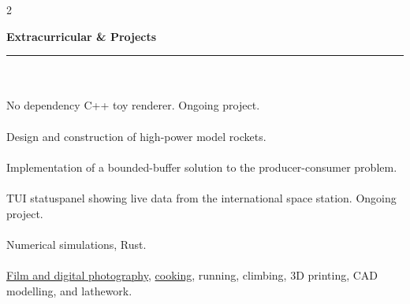 \documentclass[10pt]{article}
\begin{document}
\begin{multicols*}{2}
\begin{description}[leftmargin=6pt]
        \item \Large{\textbf{\textcolor{dt}{Extracurricular \& Projects}}\vspace{-8pt} \textcolor{dt}{\rule{0.5\textwidth-10pt}{0.2pt}}}\normalsize\\\vspace{5pt}  
        {}\\ No dependency C++ toy renderer. Ongoing project.\\ 
        \vspace{2pt}
        {}\\ Design and construction of high-power model rockets.\\
        \vspace{2pt}
        {}\\ Implementation of a bounded-buffer solution to the producer-consumer problem.\\
        \vspace{2pt}
        {}\\ TUI statuspanel showing live data from the international space station. Ongoing project.\\
        \vspace{2pt}
        {}\\ Numerical simulations, Rust.\\
        \vspace{2pt}
        {}\\\href{https://aihphysics.github.io/photography}{Film and digital photography}, \href{https://aihphysics.github.io/recipes}{cooking}, running, climbing, 3D printing, CAD modelling, and lathework.\\
    \end{description}
    \end{multicols*}
\end{document}
